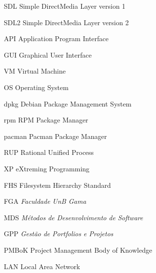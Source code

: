 \begin{siglas}
  \item[SDL] Simple DirectMedia Layer version 1
  \item[SDL2] Simple DirectMedia Layer version 2
  \item[API] Application Program Interface
  \item[GUI] Graphical User Interface
  \item[VM] Virtual Machine
  \item[OS] Operating System
  \item[dpkg] Debian Package Management System
  \item[rpm] RPM Package Manager
  \item[pacman] Pacman Package Manager
  \item[RUP] Rational Unified Process
  \item[XP] eXtreming Programming
  \item[FHS] Filesystem Hierarchy Standard
  \item[FGA] \textit{Faculdade UnB Gama}
  \item[MDS] \textit{M\'etodos de Desenvolvimento de Software}
  \item[GPP] \textit{Gest\~ao de Portfolios e Projetos}
  \item[PMBoK] Project Management Body of Knowledge
  \item[LAN] Local Area Network
\end{siglas}
